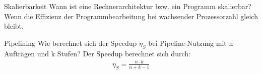 \begin{aufgabe}{Skalierbarkeit}
    Wann ist eine Rechnerarchitektur bzw. ein Programm skalierbar?
    \tcblower
    Wenn die Effizienz der Programmbearbeitung bei wachsender Prozessorzahl gleich bleibt.
\end{aufgabe}

\begin{aufgabe}{Pipelining}
    Wie berechnet sich der Speedup $\eta_S$ bei Pipeline-Nutzung mit n Aufträgen und k Stufen?
    \tcblower
    Der Speedup berechnet sich durch: 
    \begin{align*}
        \eta_S = \frac{n\cdot k}{n+k-1}
    \end{align*}
\end{aufgabe}
